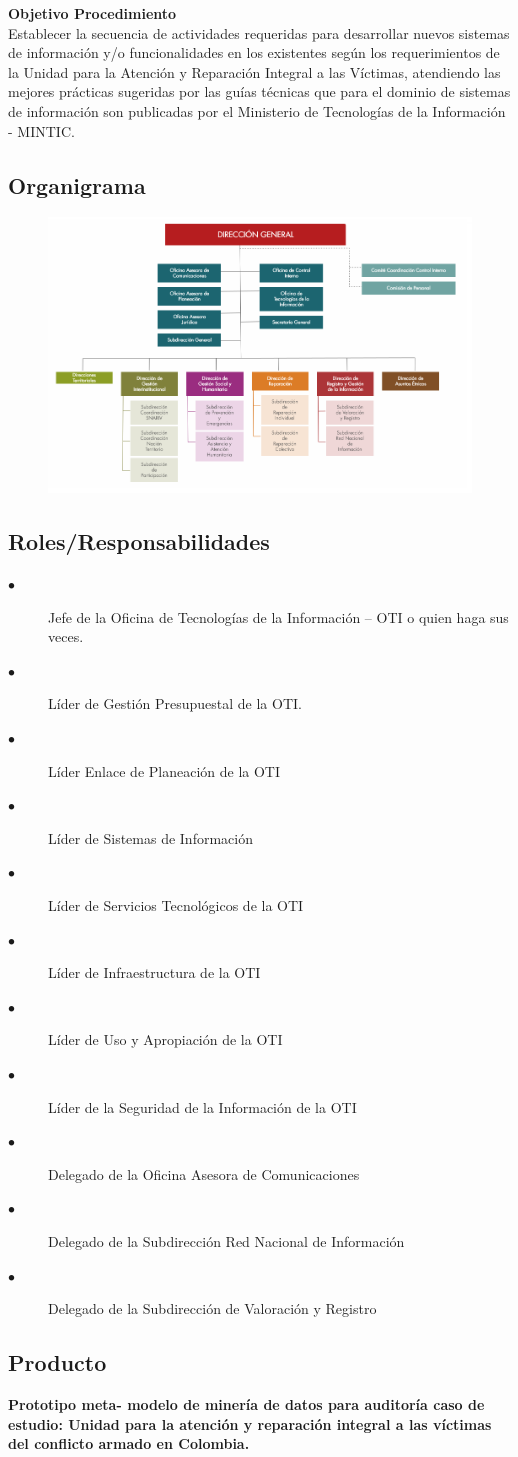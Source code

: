 \textbf{Objetivo Procedimiento}
\\Establecer la secuencia de actividades requeridas para desarrollar nuevos sistemas de información y/o funcionalidades en los existentes según los requerimientos de la Unidad para la Atención y Reparación Integral a las Víctimas, atendiendo las mejores
prácticas sugeridas por las guías técnicas que para el dominio de sistemas de información son publicadas por el Ministerio de Tecnologías de la Información - MINTIC.
\newpage
\subsection{Organigrama}
\begin{figure}[h!]
	\centering
	\includegraphics[width=0.7\linewidth]{Proyecto/Organizacion/imgs/Organigrama}
	\caption{}
\end{figure}

\subsection{Roles/Responsabilidades}
\begin{description}

\item[$\bullet$] Jefe de la Oficina de Tecnologías de la Información – OTI o quien haga sus veces.
\item[$\bullet$]Líder de Gestión Presupuestal de la OTI.
\item[$\bullet$]Líder Enlace de Planeación de la OTI
\item[$\bullet$]Líder de Sistemas de Información
\item[$\bullet$]Líder de Servicios Tecnológicos de la OTI
\item[$\bullet$]Líder de Infraestructura de la OTI
\item[$\bullet$]Líder de Uso y Apropiación de la OTI
\item[$\bullet$]Líder de la Seguridad de la Información de la OTI
\item[$\bullet$]Delegado de la Oficina Asesora de Comunicaciones
\item[$\bullet$]Delegado de la Subdirección Red Nacional de Información
\item[$\bullet$]Delegado de la Subdirección de Valoración y Registro 
\end{description}

\subsection{Producto}
\textbf{Prototipo meta- modelo de minería de datos para auditoría caso de estudio: Unidad para la atención y reparación integral a las víctimas del conflicto armado en Colombia.}